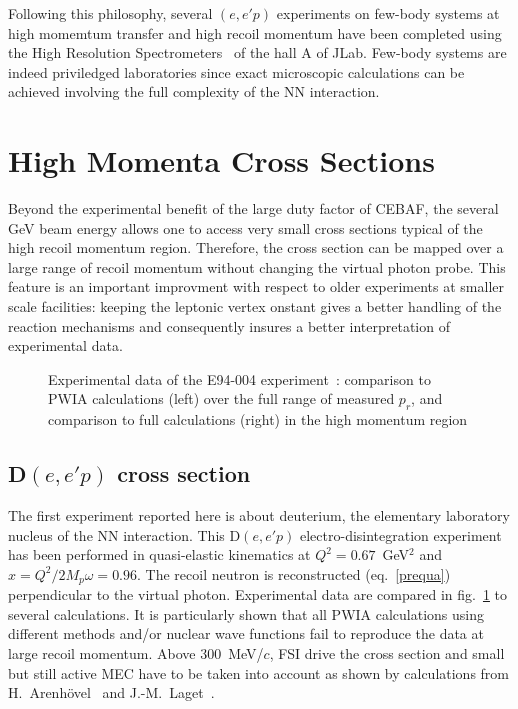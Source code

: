 \documentclass{elsart}
\begin{document}
Following this philosophy, several $(e,e'p)$ experiments on few-body systems 
at high momemtum transfer and high recoil momentum have been completed using
the High Resolution Spectrometers~\cite{Alc04} of the hall A of JLab. Few-body 
systems are indeed priviledged laboratories since exact microscopic calculations 
can be achieved involving the full complexity of the NN interaction.

%
%
\section{High Momenta Cross Sections}
\label{sec:Xsection}

Beyond the experimental benefit of the large duty factor of CEBAF, the several 
GeV beam energy allows one to access very small cross sections typical of the 
high recoil momentum region. Therefore, the cross section can be mapped over a 
large range of recoil momentum without changing the virtual photon probe. This 
feature is an important improvment with respect to older experiments at smaller 
scale facilities: keeping the leptonic vertex onstant gives a better handling 
of the reaction mechanisms and consequently insures a better interpretation of 
experimental data. 

\vspace*{-10pt}
\begin{figure}[hbt]

\vspace*{-217pt}

\vspace*{-33pt}
\caption{Experimental data of the E94-004 experiment~\cite{Ulm02}: comparison 
to PWIA calculations (left) over the full range of measured $p_r$, and 
comparison to full calculations (right) in the high momentum region}
\label{ulmer}
\end{figure}

\subsection{D$(e,e'p)$ cross section}
\label{sec:deuton}

The first experiment reported here is about deuterium, the elementary 
laboratory nucleus of the NN interaction. This D$(e,e'p)$ electro-disintegration 
experiment~\cite{Jon94} has been performed in quasi-elastic kinematics at 
$Q^2=0.67$~GeV$^2$ and $x = Q^2 / 2 M_p \omega = 0.96$. The recoil neutron is
reconstructed (eq.~\ref{prequa}) perpendicular to the virtual photon. 
Experimental data are compared in fig.~\ref{ulmer} to several 
calculations. It is particularly shown that all PWIA calculations 
using different methods and/or nuclear wave functions fail to reproduce the data 
at large recoil momentum. Above 300~MeV/$c$, FSI drive the cross section and 
small but still active MEC have to be taken into account as shown by 
calculations from H.~Arenh\"ovel~\cite{Ulm02} and J.-M.~Laget~\cite{Lag04}.
\end{document}
